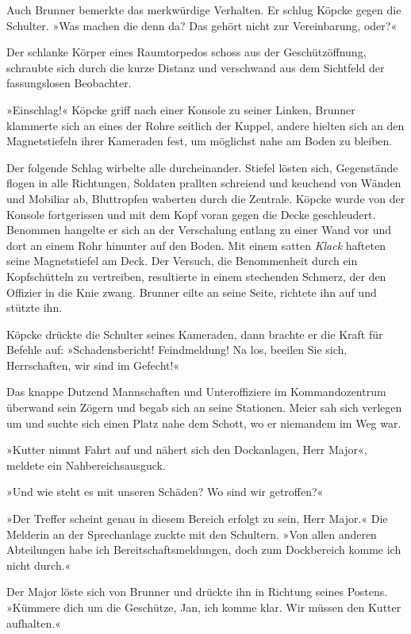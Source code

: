 Auch Brunner bemerkte das merkwürdige Verhalten. Er schlug Köpcke
gegen die Schulter. »Was machen die denn da? Das gehört nicht zur
Vereinbarung, oder?«

Der schlanke Körper eines Raumtorpedos schoss aus der
Geschützöffnung, schraubte sich durch die kurze Distanz und
verschwand aus dem Sichtfeld der fassungslosen Beobachter.

»Einschlag!« Köpcke griff nach einer Konsole zu seiner Linken,
Brunner klammerte sich an eines der Rohre seitlich der Kuppel,
andere hielten sich an den Magnetstiefeln ihrer Kameraden fest, um
möglichst nahe am Boden zu bleiben.

Der folgende Schlag wirbelte alle durcheinander. Stiefel lösten
sich, Gegenstände flogen in alle Richtungen, Soldaten prallten
schreiend und keuchend von Wänden und Mobiliar ab, Bluttropfen
waberten durch die Zentrale. Köpcke wurde von der Konsole
fortgerissen und mit dem Kopf voran gegen die Decke geschleudert.
Benommen hangelte er sich an der Verschalung entlang zu einer Wand
vor und dort an einem Rohr hinunter auf den Boden. Mit einem satten
\emph{Klack} hafteten seine Magnetstiefel am Deck. Der Versuch, die
Benommenheit durch ein Kopfschütteln zu vertreiben, resultierte in
einem stechenden Schmerz, der den Offizier in die Knie zwang.
Brunner eilte an seine Seite, richtete ihn auf und stützte ihn.

Köpcke drückte die Schulter seines Kameraden, dann brachte er die
Kraft für Befehle auf: »Schadensbericht! Feindmeldung! Na los,
beeilen Sie sich, Herrschaften, wir sind im Gefecht!«

Das knappe Dutzend Mannschaften und Unteroffiziere im
Kommandozentrum überwand sein Zögern und begab sich an seine
Stationen. Meier sah sich verlegen um und suchte sich einen Platz
nahe dem Schott, wo er niemandem im Weg war.

»Kutter nimmt Fahrt auf und nähert sich den Dockanlagen, Herr
Major«, meldete ein Nahbereichsausguck.

»Und wie steht es mit unseren Schäden? Wo sind wir getroffen?«

»Der Treffer scheint genau in diesem Bereich erfolgt zu sein, Herr
Major.« Die Melderin an der Sprechanlage zuckte mit den Schultern.
»Von allen anderen Abteilungen habe ich Bereitschaftsmeldungen,
doch zum Dockbereich komme ich nicht durch.«

Der Major löste sich von Brunner und drückte ihn in Richtung seines
Postens. »Kümmere dich um die Geschütze, Jan, ich komme klar. Wir
müssen den Kutter aufhalten.«

